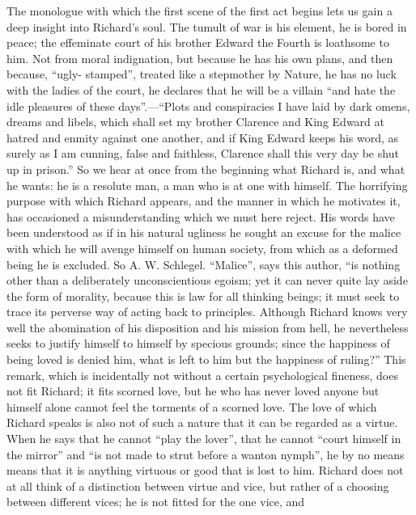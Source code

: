 \documentclass[12pt,a4paper,openany]{book}
\newcommand{\opage}[1]{\marginnote{\footnotesize\textit{[#1]}}}
\begin{document}
The monologue with which the first scene of the first act begins
lets us gain a deep insight into Richard's soul.
The tumult of war is his element, he is bored in peace;
the effeminate court of his brother Edward the Fourth is
loathsome to him. Not from moral indignation, but because
he has his own plans, and then because, ``ugly-
stamped'', treated like a stepmother by Nature, he has no luck
with the ladies of the court, he declares that he will be a
villain ``and hate the idle pleasures of these days''.---``Plots
and conspiracies I have laid by dark omens,
dreams and libels, which shall set my brother Clarence and
King Edward at hatred and enmity against one another,
and if King Edward keeps his word, as surely as I
am cunning, false and faithless, Clarence shall this very day be
shut up in prison.'' So we hear at once from the beginning what
Richard is, and what he wants: he is a resolute man,
a man who is at one with himself. The horrifying
purpose with which Richard appears, and the manner
in which he motivates it, has occasioned a misunderstanding
which we must here reject. His words have been understood
as if in his natural ugliness he sought an
excuse for the malice with which he will avenge
himself on human society, from which as a
deformed being he is excluded. So A. W. Schlegel.
``Malice'', says this author, ``is nothing other than
a deliberately unconscientious egoism; yet
it can never quite lay aside the form of morality, because
this is law for all thinking beings; it must seek
to trace its perverse way of acting back to principles.
\setcounter{footnote}{0}%
\opage{532}Although Richard knows very well the abomination of his disposition
and his mission from hell, he nevertheless seeks
to justify himself to himself by specious grounds; since
the happiness of being loved is denied him, what is left to him
but the happiness of ruling?'' This remark,
which is incidentally not without a certain psychological
fineness, does not fit Richard; it fits
scorned love, but he who has never loved
anyone but himself alone cannot feel the torments of a scorned
love. The love of which Richard
speaks is also not of such a nature that it can be regarded
as a virtue. When he says that he cannot ``play the lover'',
that he cannot ``court himself in the mirror'' and
``is not made to strut before a wanton nymph'',
he by no means means that it is anything virtuous
or good that is lost to him. Richard does not at all think
of a distinction between virtue and vice, but rather of a choosing between different
vices; he is not fitted for the one vice, and
\end{document}

